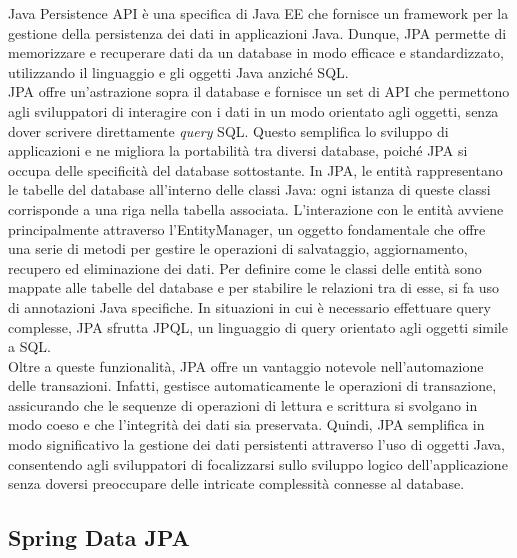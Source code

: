 Java Persistence API è una specifica di Java EE che fornisce un framework per la gestione della persistenza dei dati in applicazioni Java. Dunque, JPA permette di memorizzare e recuperare dati da un database in modo efficace e standardizzato, utilizzando il linguaggio e gli oggetti Java anziché SQL.\cite{SPRINGDATA_ibm}\\
JPA offre un’astrazione sopra il database e fornisce un set di API che permettono agli sviluppatori di interagire con i dati in un modo orientato agli oggetti, senza dover scrivere direttamente \textit{query} SQL. Questo semplifica lo sviluppo di applicazioni e ne migliora la portabilità tra diversi database, poiché JPA si occupa delle specificità del database sottostante.
In JPA, le entità rappresentano le tabelle del database all'interno delle classi Java: ogni istanza di queste classi corrisponde a una riga nella tabella associata. L'interazione con le entità avviene principalmente attraverso l'EntityManager, un oggetto fondamentale che offre una serie di metodi per gestire le operazioni di salvataggio, aggiornamento, recupero ed eliminazione dei dati. Per definire come le classi delle entità sono mappate alle tabelle del database e per stabilire le relazioni tra di esse, si fa uso di annotazioni Java specifiche. In situazioni in cui è necessario effettuare query complesse, JPA sfrutta JPQL, un linguaggio di query orientato agli oggetti simile a SQL.\cite{SPRINGDATA_vincenzoracca}\\
Oltre a queste funzionalità, JPA offre un vantaggio notevole nell'automazione delle transazioni. Infatti, gestisce automaticamente le operazioni di transazione, assicurando che le sequenze di operazioni di lettura e scrittura si svolgano in modo coeso e che l'integrità dei dati sia preservata. Quindi, JPA semplifica in modo significativo la gestione dei dati persistenti attraverso l'uso di oggetti Java, consentendo agli sviluppatori di focalizzarsi sullo sviluppo logico dell'applicazione senza doversi preoccupare delle intricate complessità connesse al database.

\subsection{Spring Data JPA}

